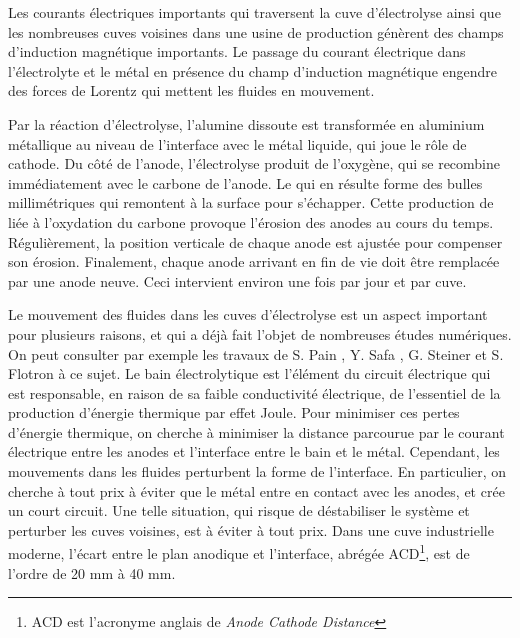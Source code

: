 Les courants électriques importants qui traversent la cuve
d'électrolyse ainsi que les nombreuses cuves voisines dans une usine
de production génèrent des champs d'induction magnétique
importants. Le passage du courant électrique dans l'électrolyte et le
métal en présence du champ d'induction magnétique engendre des forces
de Lorentz qui mettent les fluides en mouvement.

Par la réaction d'électrolyse, l'alumine dissoute est transformée en
aluminium métallique au niveau de l'interface avec le métal liquide,
qui joue le rôle de cathode. Du côté de l'anode, l'électrolyse produit
de l'oxygène, qui se recombine immédiatement avec le carbone de
l'anode. Le  qui en résulte forme des bulles millimétriques
qui remontent à la surface pour s'échapper. Cette production de
 liée à l'oxydation du carbone provoque l'érosion des anodes
au cours du temps. Régulièrement, la position verticale de chaque
anode est ajustée pour compenser son érosion. Finalement, chaque
anode arrivant en fin de vie doit être remplacée par une anode
neuve. Ceci intervient environ une fois par jour et par cuve.

Le mouvement des fluides dans les cuves d'électrolyse est un aspect
important pour plusieurs raisons, et qui a déjà fait l'objet de
nombreuses études numériques. On peut consulter par exemple les travaux de
S. Pain \cite{Pain2006}, Y. Safa \cite{Safa2009}, G. Steiner
\cite{Steiner2009} et S. Flotron \cite{Flotron2013} à ce sujet. Le bain
électrolytique est l'élément du circuit électrique qui est
responsable, en raison de sa faible conductivité électrique, de
l'essentiel de la production d'énergie thermique par effet
Joule. Pour minimiser ces pertes d'énergie thermique, on cherche à
minimiser la distance parcourue par le courant électrique entre les
anodes et l'interface entre le bain et le métal. Cependant, les
mouvements dans les fluides perturbent la forme de l'interface. En
particulier, on cherche à tout prix à éviter que le métal entre en
contact avec les anodes, et crée un court circuit. Une telle
situation, qui risque de déstabiliser le système et perturber les
cuves voisines, est à éviter à tout prix. Dans une cuve industrielle
moderne, l'écart entre le plan anodique et l'interface, abrégée
ACD\footnote{ACD est l'acronyme anglais de {\em Anode Cathode
    Distance}}, est de l'ordre de \num{20} \si{\milli\meter} à
\num{40} \si{\milli\meter}.

